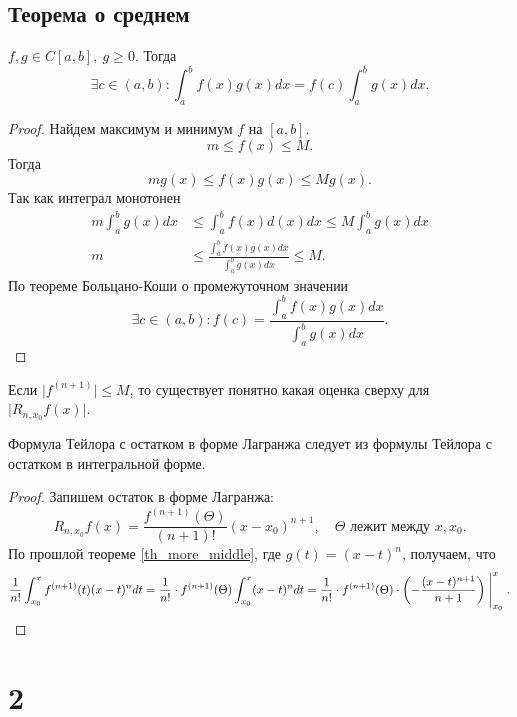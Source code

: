 \documentclass[11pt,dvipsnames]{report}
\begin{document}
\subsection{Теорема о среднем}
\begin{thm}\label{th_more_middle}
    $ f, g \in  C[a, b], ~ g \ge 0$. Тогда 
    \[
	\exists c \in (a, b): \int_{a}^{b} f(x) g(x) dx = f(c) \int_{a}^{b} g(x) dx  
    .\] 
\end{thm}
\begin{proof}
    Найдем максимум и минимум $ f$ на $ [a, b]$. \[
	m \le f(x) \le M
    .\] 
    Тогда \[
	m g(x) \le f(x) g(x) \le M g(x)
    .\] 
    Так как интеграл монотонен
    \begin{align*}
	m \int_{a}^{b} g(x) dx & \le  \int_{a}^{b} f(x) d(x) dx \le M \int_{a}^{b} g(x) dx   
	\\
	m &\le  \frac{\int_{a}^{b} f(x)g(x)dx}{\int_{a}^{b} g(x)dx } \le M 
	.
    \end{align*}
    По теореме Больцано-Коши о промежуточном значении 
    \[
	\exists c \in (a, b): f(c) = \frac{\int_{a}^{b} f(x)g(x)dx}{\int_{a}^{b} g(x)dx } 
    .\] 
\end{proof}
\begin{cor}
    Если $ \lvert f^{(n+1)} \rvert \le M$, то существует понятно какая оценка сверху для $ \lvert R_{n, x_0} f(x) \rvert$.
\end{cor}
\begin{thm}
    Формула Тейлора с остатком в форме Лагранжа следует из формулы Тейлора с остатком в интегральной форме.
\end{thm}
\begin{proof}
    Запишем остаток в форме Лагранжа:
    \[
	R_{n, x_0} f(x) = \frac{f^{(n+1)}(\Theta)}{(n+1)!} (x-x_0)^{n+1}, \quad \Theta \text{ лежит между } x, x_0
    .\] 
    По прошлой теореме \ref{th_more_middle}, где $ g(t) = (x-t)^{n}$, получаем, что
    \[
	\frac{1}{n!} \int_{x_0}^{x} f^{(n+1)} (t)(x-t)^{n} dt = \frac{1}{n!} \cdot f^{(n+1)}(\Theta) \int_{x_0}^{x} (x-t)^{n}dt = \frac{1}{n!} \cdot f^{(n+1)}(\Theta) \cdot \left(-\frac{  (x-t)^{n+1}}{n+1} \right) \Biggm |_{x_0}^{x}
    .\] 
\end{proof}
\section{2}
\end{document}
